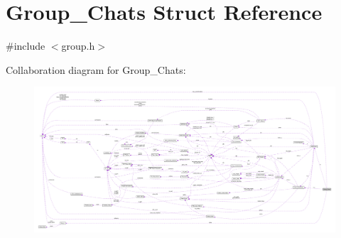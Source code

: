 \hypertarget{struct_group___chats}{\section{Group\+\_\+\+Chats Struct Reference}
\label{struct_group___chats}
}


{\ttfamily \#include $<$group.\+h$>$}



Collaboration diagram for Group\+\_\+\+Chats\+:
\nopagebreak
\begin{figure}[H]
\begin{center}
\leavevmode
\includegraphics[width=350pt]{df/d3a/struct_group___chats__coll__graph}
\end{center}
\end{figure}
